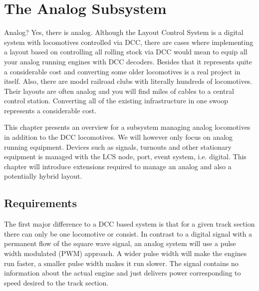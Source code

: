 \chapter{The Analog Subsystem}

Analog? Yes, there is analog. Although the Layout Control System is a digital system with locomotives controlled via DCC, there are cases where implementing a layout based on controlling all rolling stock via DCC would mean to equip all your analog running engines with DCC decoders. Besides that it represents quite a considerable cost and converting some older locomotives is a real project in itself. Also, there are model railroad clubs with literally hundreds of locomotives. Their layouts are often analog and you will find miles of cables to a central control station. Converting all of the existing infrastructure in one swoop represents a considerable cost.

This chapter presents an overview for a subsystem managing analog locomotives in addition to the DCC locomotives. We will however only focus on analog running equipment. Devices such as signals, turnouts and other stationary equipment is managed with the LCS node, port, event system, i.e. digital. This chapter will introduce extensions required to manage an analog and also a potentially hybrid layout.

\section{Requirements}

The first major difference to a DCC based system is that for a given track section there can only be one locomotive or consist. In contrast to a digital signal with a permanent flow of the square wave signal, an analog system will use a pulse width modulated (PWM) approach. A wider pulse width will make the engines run faster, a smaller pulse width makes it run slower. The signal contains no information about the actual engine and just delivers power corresponding to speed desired to the track section.

